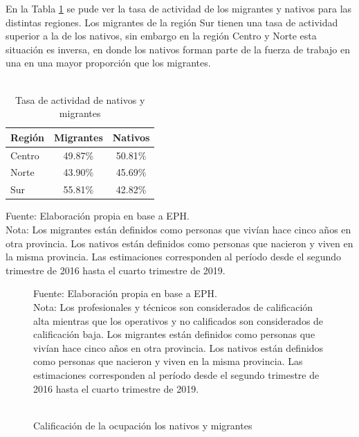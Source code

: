 \documentclass[12pt,a4paper]{article}
\begin{document}
En la Tabla \ref{cuadro:tasaactiv_mig} se pude ver la tasa de actividad de  los migrantes y nativos para las distintas regiones. Los migrantes de la región Sur tienen una tasa de actividad superior a la de los nativos, sin embargo en la región Centro y Norte esta situación es inversa, en donde los nativos forman parte de la fuerza de trabajo en una en una mayor proporción que los migrantes.
\begin{table}[htbp!]
\centering
\caption{\\Tasa de actividad de nativos y migrantes} 
\begin{tabular}{lcc}
  \hline
 Región & Migrantes & Nativos \\ 
  \hline
Centro & 49.87\% & 50.81\% \\ 
Norte & 43.90\% & 45.69\% \\ 
Sur & 55.81\%  & 42.82\% \\
   \hline
\end{tabular}
\label{cuadro:tasaactiv_mig}
\begin{flushleft}
\begin{scriptsize}
Fuente: Elaboración propia en base a EPH.\\
Nota: Los migrantes están definidos como personas que vivían hace cinco años en otra provincia. Los nativos están definidos como personas que nacieron y viven en la misma provincia. Las estimaciones corresponden al período desde el segundo trimestre de 2016 hasta el cuarto trimestre de 2019.\\
\end{scriptsize}
\end{flushleft}
\end{table}

\begin{figure}[htbp!]
\begin{center}
\caption{\\Calificación de la ocupación los nativos y migrantes}
\label{figure:calif_mig}
 
\end{center}
\begin{flushleft}
\begin{scriptsize}
Fuente: Elaboración propia en base a EPH.\\
Nota: Los profesionales y técnicos son considerados de calificación alta mientras que los operativos y no calificados son considerados de calificación baja. Los migrantes están definidos como personas que vivían hace cinco años en otra provincia. Los nativos están definidos como personas que nacieron y viven en la misma provincia. Las estimaciones corresponden al período desde el segundo trimestre de 2016 hasta el cuarto trimestre de 2019.\\
\end{scriptsize}
\end{flushleft}
\end{figure}
\end{document}
